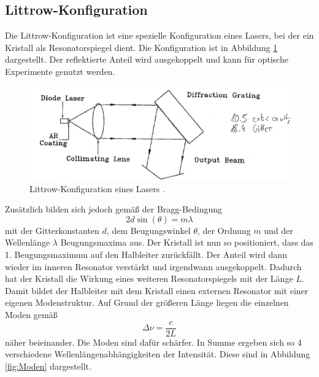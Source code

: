 \subsection{Littrow-Konfiguration}
Die Littrow-Konfiguration ist eine spezielle Konfiguration eines Lasers, bei der ein Kristall als Resonatorspiegel dient.
Die Konfiguration ist in Abbildung \ref{fig:Littrow} dargestellt. Der reflektierte Anteil wird ausgekoppelt und kann für optische Experimente genutzt werden.
\begin{figure}[H]
    \centering
    \includegraphics[scale=0.8]{pictures/Littrow.png}
    \caption{Littrow-Konfiguration eines Lasers \cite{teachspin}.}
    \label{fig:Littrow}
\end{figure}
\noindent Zusätzlich bilden sich jedoch gemäß der Bragg-Bedingung
\begin{equation}
    2d\sin(\theta)=m\lambda
\end{equation}
mit der Gitterkonstanten $d$, dem Beugungswinkel $\theta$, der Ordnung $m$ und der Wellenlänge $\lambda$ Beugungsmaxima aus. 
Der Kristall ist nun so positioniert, dass das 1. Beugungsmaximum auf den Halbleiter zurückfällt.
Der Anteil wird dann wieder im inneren Resonator verstärkt und irgendwann ausgekoppelt. Dadurch hat der Kristall 
die Wirkung eines weiteren Resonatorspiegels mit der Länge $L$. Damit bildet der Halbleiter mit dem Kristall einen externen Resonator
mit einer eigenen Modenstruktur. Auf Grund der größeren Länge liegen die einzelnen Moden gemäß 
\begin{equation}
    \Delta \nu = \frac{c}{2L}
\end{equation}
näher beieinander. Die Moden sind dafür schärfer. In Summe ergeben sich so 4 verschiedene Wellenlängenabhängigkeiten der Intensität.
Diese sind in Abbildung \ref{fig:Moden} dargestellt.
